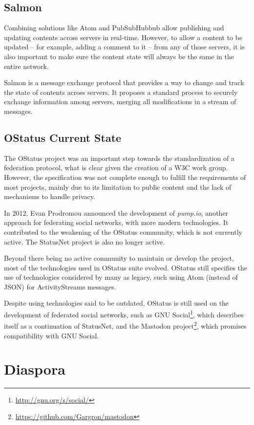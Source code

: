 \subsection{Salmon}

Combining solutions like Atom and PubSubHubbub allow publishing and
updating contents across servers in real-time. However, to allow a
content to be updated -- for example, adding a comment to it -- from any
of those servers, it is also important to make sure the content state
will always be the same in the entire network.

Salmon is a message exchange protocol that provides a way to change and
track the state of contents across servers. It proposes a standard
process to securely exchange information among servers, merging
all modifications in a stream of messages.

\subsection{OStatus Current State}

The OStatus project was an important step towards the standardization of
a federation protocol, what is clear given the creation of a W3C work
group.  However, the specification was not complete enough to fulfill
the requirements of most projects, mainly due to its limitation to
public content and the lack of mechanisms to handle privacy.

In 2012, Evan Prodromou announced the development of \textit{pump.io},
another approach for federating social networks, with more modern
technologies. It contributed to the weakening of the OStatus community,
which is not currently active. The StatusNet project is also no longer
active.

Beyond there being no active community to maintain or develop the
project, most of the technologies used in OStatus suite evolved. OStatus
still specifies the use of technologies considered by many as legacy,
such using Atom (instead of JSON) for ActivityStreams messages.

Despite using technologies said to be outdated, OStatus is still used on the
development of federated social networks, such as GNU
Social\footnote{\url{http://gnu.org/s/social/}}, which describes itself
as a continuation of StatusNet, and the Mastodon
project\footnote{\url{https://github.com/Gargron/mastodon}}, which promises
compatibility with GNU Social.

\section{Diaspora}

